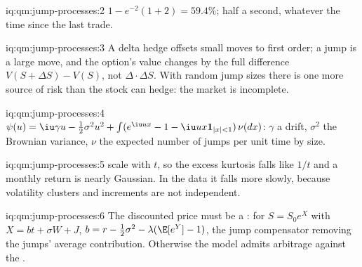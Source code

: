 \begin{solution}{iq:qm:jump-processes:2}
$1 - e^{-2}(1 + 2) = 59.4\%$; half a second, whatever the time since the last trade.
\end{solution}

\begin{solution}{iq:qm:jump-processes:3}
A delta hedge offsets small moves to first order; a jump is a large move, and the option's value changes
by the full difference $V(S + \Delta S) - V(S)$, not $\Delta\cdot\Delta S$. With random jump sizes there is one more
source of risk than the stock can hedge: the market is incomplete.
\end{solution}

\begin{solution}{iq:qm:jump-processes:4}
$\psi(u) = \iu\gamma u - \tfrac12\sigma^2u^2 + \int(e^{\iu ux} - 1 - \iu ux\mathbf 1_{|x|<1})\,\nu(dx)$: $\gamma$ a drift, $\sigma^2$ the
Brownian variance, $\nu$ the expected number of jumps per unit time by size.
\end{solution}

\begin{solution}{iq:qm:jump-processes:5}
 scale with $t$, so the excess kurtosis falls like $1/t$ and a monthly return is nearly
Gaussian. In the data it falls more slowly, because volatility clusters and increments are not
independent.
\end{solution}

\begin{solution}{iq:qm:jump-processes:6}
The discounted price must be a : for $S = S_0e^X$ with $X = bt + \sigma W + J$, $b = r - \tfrac12\sigma^2 -
\lambda(\E[e^Y] - 1)$, the jump compensator removing the jumps' average contribution. Otherwise the model
admits arbitrage against the .
\end{solution}
